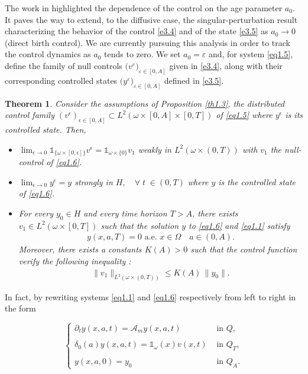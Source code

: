 \documentclass[10pt, a4]{amsart}
\newcounter{assu}
\theoremstyle{plain}
\newtheorem{theorem}[lemma]{Theorem}
\theoremstyle{definition}
\theoremstyle{remark}
\numberwithin{equation}{section}
\def\to{\rightarrow}
\begin{document}
The work in \cite{ref18} highlighted the dependence of the control on the age parameter $a_0$. It paves the way to extend, to the diffusive case, the singular-perturbation result characterizing the behavior of the control \eqref{e3.4} and of the state \eqref{e3.5} as $a_0 \to 0$ (direct birth control). We are currently pursuing this analysis in order to track the control dynamics as $a_0$ tends to zero.  We set $a_0 = \varepsilon$ and, for system \eqref{eq1.5}, define the family of null controls $\bigl(v^{\varepsilon}\bigr)_{\varepsilon\in[0,A]}$ given in \eqref{e3.4}, along with their corresponding controlled states $\bigl(y^{\varepsilon}\bigr)_{\varepsilon\in[0,A]}$ defined in \eqref{e3.5}.
\begin{theorem}\label{th1.4}
Consider the assumptions of Proposition \ref{th1.3}, the distributed control family  $(v^{\epsilon})_{\epsilon\in [0,A]}\subset L^2 (\omega\times[0,A]\times[0,T])$ of \eqref{eq1.5}   where $y^{\epsilon}$ is its controlled state. Then,  
\begin{itemize}
\item[1-] $\lim_{\epsilon\longrightarrow 0}\mathds{1}_{\lbrace\omega\times[0,\epsilon]\rbrace} v^{\epsilon}=\mathds{1}_{\omega\times\lbrace 0\rbrace}v_1$ weakly   in $L^2 (\omega\times(0,T))$ with $v_1$ the null-control of \eqref{eq1.6}.
\item[2-] $\lim_{\epsilon\longrightarrow 0} y^{\epsilon}=y$  strongly in $H,\quad \forall \;t\;\in (0,T)$  where $y$ is the  controlled state  of \eqref{eq1.6}.
\item[3-] For every $y_0\in H$ and every time horizon $T> A$, there exists $v_1 \in L^2(\omega\times[0,T])$ such that the solution $y$ to \eqref{eq1.6} and \eqref{eq1.1} satisfy 
\begin{align}\label{e3.8}
     y(x,a,T)=0\text{ a.e. }x\in\Omega\quad a\in(0,A).
\end{align} 
Moreover, there exists a constants $K(A)>0$ such that the control function  verify the following inequality :
\begin{align}
    \|v_1\|_{L^2(\omega\times(0,T))} \le K(A)\,\|y_{0}\|.
\end{align}
\end{itemize}
\end{theorem}
In fact, by rewriting systems \eqref{eq1.1} and \eqref{eq1.6} respectively from left to right in the form 
\noindent
\begin{minipage}{0.45\linewidth}
\begin{equation*}
\left\lbrace 
\begin{array}{ll}
\partial_{t}y(x,a,t)=\mathcal{A}_my(x,a,t) & \text{ in }  Q,\\
 \\ 
\delta_0(a)y(x,a,t)=\mathds{1}_{\omega}(x)v(x,t) &\text{ in }  Q_T,\\
\\y(x,a,0)=y_0 &\text{ in }  Q_A.
\end{array}
\right.
\end{equation*}
\end{minipage}
\end{document}
